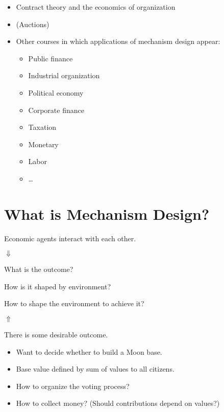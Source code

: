 \documentclass[english,handout,10pt]{beamer}		%
\def\lyxframeend{} %
\begin{document}
\begin{itemize}
	\item Contract theory and the economics of organization
	\item (Auctions)
	\item Other courses in which applications of mechanism design appear:
	\begin{itemize}
		\item Public finance
		\item Industrial organization
		\item Political economy
		\item Corporate finance
		\item Taxation
		\item Monetary
		\item Labor
		\item \ldots{}
	\end{itemize}
\end{itemize}
\lyxframeend





\section{What is Mechanism Design?}

\begin{center}
	Economic agents interact with each other.
	\pause
	
	$\Downarrow$
	
	What is the outcome? 
	
	How is it shaped by environment?
\end{center}
\lyxframeend


\begin{center}
	\pause[2] 
	How to shape the environment to achieve it?
	
	$\Uparrow$
	
	\pause[1]
	There is some desirable outcome.
\end{center}
\lyxframeend


\begin{itemize}
	\item Want to decide whether to build a Moon base.
	\item Base value defined by sum of values to all citizens.
	\item How to organize the voting process?
	\item How to collect money? (Should contributions depend on values?)
\end{itemize}
\lyxframeend
\end{document}
